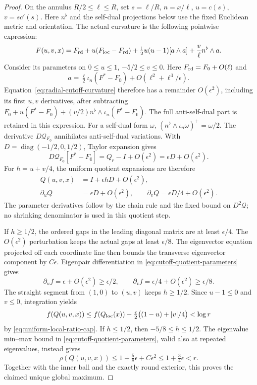\documentclass[11pt]{article}
\numberwithin{equation}{section}
\theoremstyle{definition}
\theoremstyle{remark}
\begin{document}
\begin{proof}
On the annulus $R/2\le\ell\le R$, set
$s=\ell/R$, $n=x/\ell$, $u=c(s)$, $v=sc'(s)$.
Here $n^\flat$ and the self-dual projections below use the
fixed Euclidean metric and orientation. The actual curvature is
the following pointwise expression:
\begin{equation}\label{eq:radial-cutoff-curvature}
 F(u,v,x)=F_{\rm rd}+u(F_{\rm loc}-F_{\rm rd})
       +\tfrac12u(u-1)[a\wedge a]
       +\frac v\ell n^\flat\wedge a.
\end{equation}
Consider its parameters on $0\le u\le1$, $-5/2\le v\le0$.
Here $F_{\rm rd}=F_0+O(\ell)$ and
\[
 a=\tfrac\ell2\iota_n(F^*-F_0)+O(\ell^2+\ell^3/\epsilon).
\]
Equation~\eqref{eq:radial-cutoff-curvature} therefore has a
remainder $O(\epsilon^2)$, including its first $u,v$
derivatives, after subtracting
$F_0+u(F^*-F_0)+(v/2)n^\flat\wedge\iota_n(F^*-F_0)$.
The full anti-self-dual part is retained in this expression.
For a self-dual form $\omega$,
$(n^\flat\wedge\iota_n\omega)^+=\omega/2$.
The derivative $D\mathcal Q_{F_0}$ annihilates anti-self-dual
variations. With $D=\operatorname{diag}(-1/2,0,1/2)$, Taylor
expansion gives
\[
 D\mathcal Q_{F_0}[F^*-F_0]=Q_r-I+O(\epsilon^2)
                           =\epsilon D+O(\epsilon^2).
\]
For $h=u+v/4$, the uniform quotient expansions are therefore
\begin{equation}\label{eq:cutoff-quotient-parameters}
 \begin{aligned}
 Q(u,v,x)&=I+\epsilon hD+O(\epsilon^2),\\
 \partial_uQ&=\epsilon D+O(\epsilon^2),\qquad
 \partial_vQ=\epsilon D/4+O(\epsilon^2).
 \end{aligned}
\end{equation}
The parameter derivatives follow by the chain rule and the
fixed bound on $D^2\mathcal Q$; no shrinking denominator
is used in this quotient step.

If $h\ge1/2$, the ordered gaps in the leading diagonal
matrix are at least $\epsilon/4$. The $O(\epsilon^2)$
perturbation keeps the actual gaps at least $\epsilon/8$.
The eigenvector equation projected off each coordinate line
then bounds the transverse eigenvector component by
$C\epsilon$. Eigenpair differentiation in
\eqref{eq:cutoff-quotient-parameters} gives
\[
 \partial_uf=\epsilon+O(\epsilon^2)\ge\epsilon/2,
 \qquad
 \partial_vf=\epsilon/4+O(\epsilon^2)\ge\epsilon/8.
\]
The straight segment from $(1,0)$ to $(u,v)$ keeps
$h\ge1/2$. Since $u-1\le0$ and $v\le0$, integration yields
\[
 f(Q(u,v,x))\le f(Q_{\rm loc}(x))
                -\tfrac\epsilon2\big((1-u)+|v|/4\big)<\log r
\]
by \eqref{eq:uniform-local-ratio-cap}. If $h\le1/2$,
then $-5/8\le h\le1/2$. The eigenvalue min--max bound in
\eqref{eq:cutoff-quotient-parameters}, valid also at repeated
eigenvalues, instead gives
\[
 \rho(Q(u,v,x))\le1+\tfrac58\epsilon+C\epsilon^2
                  \le1+\tfrac34\epsilon<r.
\]
Together with the inner ball and the exactly round exterior,
this proves the claimed unique global maximum.


\end{proof}
\end{document}
